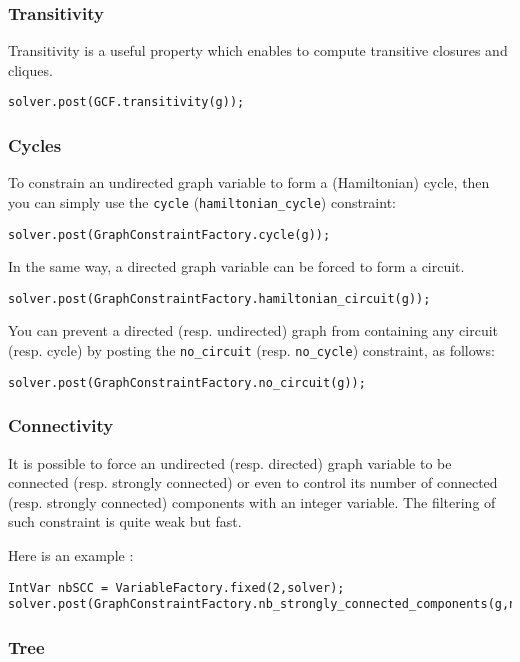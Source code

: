 \documentclass{article}
\begin{document}
\subsubsection{Transitivity}

Transitivity is a useful property which enables to compute transitive closures and cliques. 
\begin{lstlisting}
solver.post(GCF.transitivity(g));
\end{lstlisting}  

\subsubsection{Cycles}

To constrain an undirected graph variable to form a (Hamiltonian) cycle, then you can simply use the \texttt{cycle} (\texttt{hamiltonian\_cycle}) constraint: 
\begin{lstlisting}
solver.post(GraphConstraintFactory.cycle(g));
\end{lstlisting} 
In the same way, a directed graph variable can be forced to form a circuit.
\begin{lstlisting}
solver.post(GraphConstraintFactory.hamiltonian_circuit(g));
\end{lstlisting} 

You can prevent a directed (resp. undirected) graph from containing any circuit (resp. cycle) by posting the \texttt{no\_circuit} (resp. \texttt{no\_cycle}) constraint, as follows:
\begin{lstlisting}
solver.post(GraphConstraintFactory.no_circuit(g));
\end{lstlisting}


\subsubsection{Connectivity}

It is possible to force an undirected (resp. directed) graph variable to be connected (resp. strongly connected) or even to control its number of connected (resp. strongly connected) components with an integer variable. The filtering of such constraint is quite weak but fast.

Here is an example :
\begin{lstlisting}
IntVar nbSCC = VariableFactory.fixed(2,solver);
solver.post(GraphConstraintFactory.nb_strongly_connected_components(g,nbSCC));
\end{lstlisting}

\subsubsection{Tree}
\end{document}
